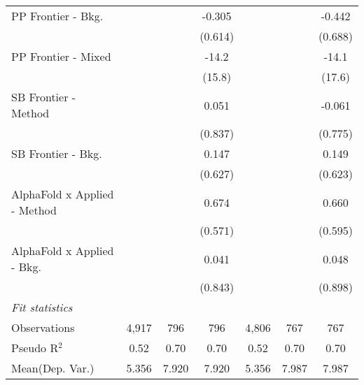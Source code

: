\begin{tabular}{lcccccc}
   PP Frontier - Bkg.           &               &              & -0.305       &               &              & -0.442\\   
                                &               &              & (0.614)      &               &              & (0.688)\\   
   PP Frontier - Mixed          &               &              & -14.2        &               &              & -14.1\\   
                                &               &              & (15.8)       &               &              & (17.6)\\   
   SB Frontier - Method         &               &              & 0.051        &               &              & -0.061\\   
                                &               &              & (0.837)      &               &              & (0.775)\\   
   SB Frontier - Bkg.           &               &              & 0.147        &               &              & 0.149\\   
                                &               &              & (0.627)      &               &              & (0.623)\\   
   AlphaFold x Applied - Method &               &              & 0.674        &               &              & 0.660\\   
                                &               &              & (0.571)      &               &              & (0.595)\\   
   AlphaFold x Applied - Bkg.   &               &              & 0.041        &               &              & 0.048\\   
                                &               &              & (0.843)      &               &              & (0.898)\\   
   \midrule
   \emph{Fit statistics}\\
   Observations                 & 4,917         & 796          & 796          & 4,806         & 767          & 767\\  
   Pseudo R$^2$                 & 0.52          & 0.70         & 0.70         & 0.52          & 0.70         & 0.70\\  
Mean(Dep. Var.) & 5.356 & 7.920 & 7.920 & 5.356 & 7.987 & 7.987 \\
   

\end{tabular}

